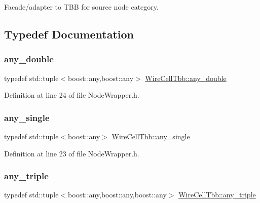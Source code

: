 Facade/adapter to T\+BB for source node category. 

\subsection{Typedef Documentation}
\mbox{\label{namespace_wire_cell_tbb_a5ebba472c9f7492c293d2705740ea148}} 
\subsubsection{\texorpdfstring{any\+\_\+double}{any\_double}}
{\footnotesize\ttfamily typedef std\+::tuple$<$boost\+::any,boost\+::any$>$ \hyperlink{namespace_wire_cell_tbb_a5ebba472c9f7492c293d2705740ea148}{Wire\+Cell\+Tbb\+::any\+\_\+double}}



Definition at line 24 of file Node\+Wrapper.\+h.

\mbox{\label{namespace_wire_cell_tbb_add86809a147ec9695fadae148a7059ea}} 
\subsubsection{\texorpdfstring{any\+\_\+single}{any\_single}}
{\footnotesize\ttfamily typedef std\+::tuple$<$boost\+::any$>$ \hyperlink{namespace_wire_cell_tbb_add86809a147ec9695fadae148a7059ea}{Wire\+Cell\+Tbb\+::any\+\_\+single}}



Definition at line 23 of file Node\+Wrapper.\+h.

\mbox{\label{namespace_wire_cell_tbb_a7fd069c2369fd99a53829ff09b7a32b6}} 
\subsubsection{\texorpdfstring{any\+\_\+triple}{any\_triple}}
{\footnotesize\ttfamily typedef std\+::tuple$<$boost\+::any,boost\+::any,boost\+::any$>$ \hyperlink{namespace_wire_cell_tbb_a7fd069c2369fd99a53829ff09b7a32b6}{Wire\+Cell\+Tbb\+::any\+\_\+triple}}



